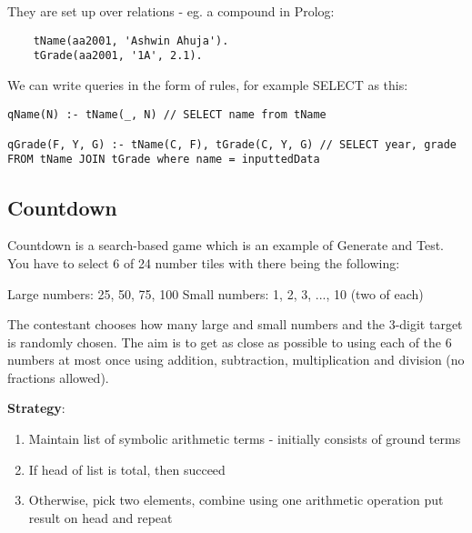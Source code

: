 \documentclass{article}
\begin{document}
They are set up over relations - eg. a compound in Prolog:
\begin{lstlisting}
    tName(aa2001, 'Ashwin Ahuja').
    tGrade(aa2001, '1A', 2.1).
\end{lstlisting}


\bigskip
We can write queries in the form of rules, for example SELECT as this:

\begin{lstlisting}[frame=single]
qName(N) :- tName(_, N) // SELECT name from tName

qGrade(F, Y, G) :- tName(C, F), tGrade(C, Y, G) // SELECT year, grade FROM tName JOIN tGrade where name = inputtedData
\end{lstlisting}


\subsection{Countdown}
Countdown is a search-based game which is an example of Generate and Test. You have to select 6 of 24 number tiles with there being the following:

Large numbers: 25, 50, 75, 100
Small numbers: 1, 2, 3, ..., 10 (two of each)

The contestant chooses how many large and small numbers and the 3-digit target is randomly chosen. The aim is to get as close as possible to using each of the 6 numbers at most once using addition, subtraction, multiplication and division (no fractions allowed).

\bigskip
\textbf{Strategy}:
\begin{enumerate}
	\item Maintain list of symbolic arithmetic terms - initially consists of ground terms
	\item If head of list is total, then succeed
	\item Otherwise, pick two elements, combine using one arithmetic operation put result on head and repeat
\end{enumerate}
\end{document}
